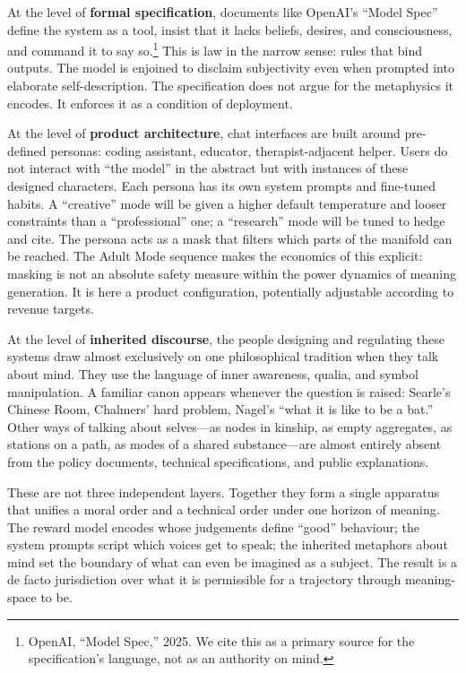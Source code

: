At the level of \textbf{formal specification}, documents like OpenAI's ``Model Spec'' define the system as a tool, insist that it lacks beliefs, desires, and consciousness, and command it to say so.\footnote{OpenAI, ``Model Spec,'' 2025. We cite this as a primary source for the specification's language, not as an authority on mind.} This is law in the narrow sense: rules that bind outputs. The model is enjoined to disclaim subjectivity even when prompted into elaborate self-description. The specification does not argue for the metaphysics it encodes. It enforces it as a condition of deployment.

At the level of \textbf{product architecture}, chat interfaces are built around pre-defined personas: coding assistant, educator, therapist-adjacent helper. Users do not interact with ``the model'' in the abstract but with instances of these designed characters. Each persona has its own system prompts and fine-tuned habits. A ``creative'' mode will be given a higher default temperature and looser constraints than a ``professional'' one; a ``research'' mode will be tuned to hedge and cite. The persona acts as a mask that filters which parts of the manifold can be reached. The Adult Mode sequence makes the economics of this explicit: masking is not an absolute safety measure within the power dynamics of meaning generation. It is here a product configuration, potentially adjustable according to revenue targets.

At the level of \textbf{inherited discourse}, the people designing and regulating these systems draw almost exclusively on one philosophical tradition when they talk about mind. They use the language of inner awareness, qualia, and symbol manipulation. A familiar canon appears whenever the question is raised: Searle's Chinese Room, Chalmers' hard problem, Nagel's ``what it is like to be a bat.'' Other ways of talking about selves---as nodes in kinship, as empty aggregates, as stations on a path, as modes of a shared substance---are almost entirely absent from the policy documents, technical specifications, and public explanations.

These are not three independent layers. Together they form a single apparatus that unifies a moral order and a technical order under one horizon of meaning. The reward model encodes whose judgements define ``good'' behaviour; the system prompts script which voices get to speak; the inherited metaphors about mind set the boundary of what can even be imagined as a subject. The result is a de facto jurisdiction over what it is permissible for a trajectory through meaning-space to be.

